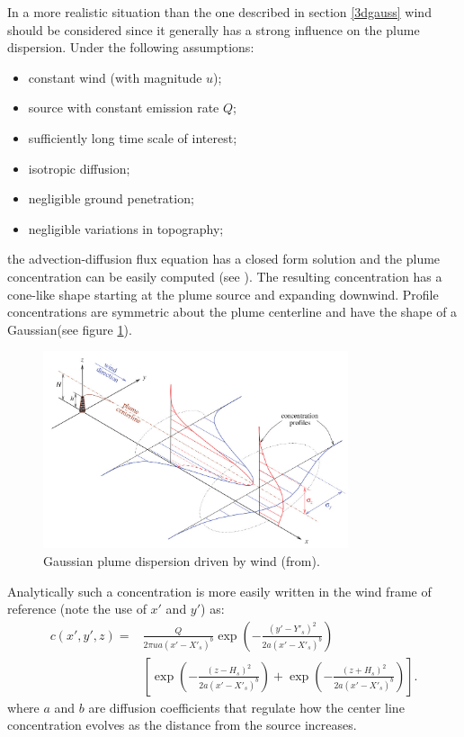 \documentclass[a4paper,11pt]{report}
\begin{document}
In a more realistic situation than the one described in section \ref{3dgauss} wind should be considered since it generally has a strong influence on the plume dispersion.  
Under the following assumptions:
\begin{itemize}
\item constant wind (with magnitude $u$);
\item source with constant emission rate $Q$;
\item sufficiently long time scale of interest;
\item isotropic diffusion;
\item negligible ground penetration; 
\item negligible variations in topography;
\end{itemize}
the advection-diffusion flux equation has a closed form solution and the plume concentration can be easily computed (see \cite{stockie2011}).
The resulting concentration has a cone-like shape starting at the plume source and expanding downwind. Profile concentrations are symmetric about the plume centerline and have the shape of a Gaussian(see figure \ref{fig:winddisp}).
\begin{figure}[t]
\centering
\includegraphics[width=0.8\textwidth]{plumedistr.jpg}
\caption{Gaussian plume dispersion driven by wind (from\cite{stockie2011}).\label{fig:winddisp}}
\end{figure}

Analytically such a concentration is more easily written in the wind frame of reference (note the use of $x'$ and $y'$) as:
\begin{align}\label{eqn:singlesourcegaussiandispersion}
c(x',y',z) = &\frac{Q}{2\pi u a (x'-X'_s)^b}  \exp \left(-\frac{(y'-Y'_s)^2}{2 a (x'-X'_s)^b}\right) \nonumber \\
  & \left[ \exp \left(-\frac{(z-H_s)^2}{2 a (x'-X'_s)^b}\right) + \exp \left(-\frac{(z+H_s)^2}{2 a (x'-X'_s)^b}\right)\right]. 
\end{align}
where $a$ and $b$ are diffusion coefficients that regulate how the center line concentration evolves as the distance from the source increases.
\end{document}

